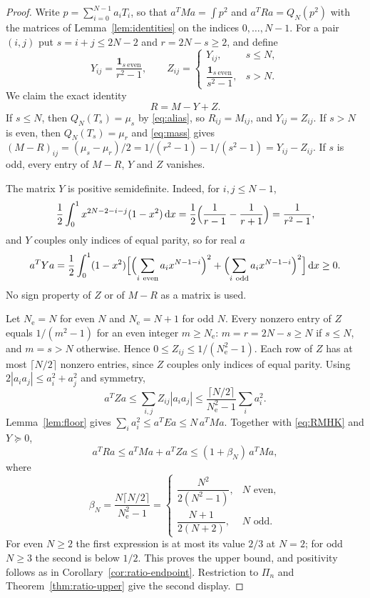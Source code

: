 \documentclass{siamart251216}
\newcommand{\Pn}{\Pi}
\newcommand{\dd}{\,\mathrm d}
\begin{document}
\begin{proof}
Write $p=\sum_{i=0}^{N-1}a_iT_i$, so that $a^TMa=\int p^2$ and
$a^TRa=Q_N(p^2)$ with the matrices of Lemma~\ref{lem:identities} on
the indices $0,\dots,N-1$. For a pair $(i,j)$ put $s=i+j\le2N-2$ and
$r=2N-s\ge2$, and define
\[
 Y_{ij}=\frac{\boldsymbol1_{s\ \mathrm{even}}}{r^2-1},\qquad
 Z_{ij}=\begin{cases}
   Y_{ij},&s\le N,\\[2pt]
   \dfrac{\boldsymbol1_{s\ \mathrm{even}}}{s^2-1},&s>N.
 \end{cases}
\]
We claim the exact identity
\begin{equation}\label{eq:RMHK}
 R=M-Y+Z .
\end{equation}
If $s\le N$, then $Q_N(T_s)=\mu_s$ by \eqref{eq:alias}, so $R_{ij}=M_{ij}$,
and $Y_{ij}=Z_{ij}$. If $s>N$ is even, then $Q_N(T_s)=\mu_r$ and
\eqref{eq:mass} gives
$(M-R)_{ij}=(\mu_s-\mu_r)/2=1/(r^2-1)-1/(s^2-1)=Y_{ij}-Z_{ij}$.
If $s$ is odd, every entry of $M-R$, $Y$ and $Z$ vanishes.

The matrix $Y$ is positive semidefinite. Indeed, for $i,j\le N-1$,
\[
 \frac12\int_0^1 x^{2N-2-i-j}(1-x^2)\dd x
 =\frac12\Bigl(\frac1{r-1}-\frac1{r+1}\Bigr)=\frac1{r^2-1},
\]
and $Y$ couples only indices of equal parity, so for real $a$
\[
 a^TYa=\frac12\int_0^1(1-x^2)\Bigl[
 \Bigl(\sum_{i\ \mathrm{even}}a_ix^{N-1-i}\Bigr)^2
 +\Bigl(\sum_{i\ \mathrm{odd}}a_ix^{N-1-i}\Bigr)^2\Bigr]\dd x\ge0 .
\]
No sign property of $Z$ or of $M-R$ as a matrix is used.

Let $N_{\mathrm e}=N$ for even $N$ and $N_{\mathrm e}=N+1$ for odd $N$. Every
nonzero entry of $Z$ equals $1/(m^2-1)$ for an even integer $m\ge N_{\mathrm e}$:
$m=r=2N-s\ge N$ if $s\le N$, and $m=s>N$ otherwise. Hence
$0\le Z_{ij}\le1/(N_{\mathrm e}^2-1)$. Each row of $Z$ has at most
$\lceil N/2\rceil$ nonzero entries, since $Z$ couples only indices of
equal parity. Using $2|a_ia_j|\le a_i^2+a_j^2$ and symmetry,
\[
 a^TZa\le\sum_{i,j}Z_{ij}|a_ia_j|
 \le\frac{\lceil N/2\rceil}{N_{\mathrm e}^2-1}\sum_ia_i^2 .
\]
Lemma~\ref{lem:floor} gives $\sum_ia_i^2\le a^TEa\le N\,a^TMa$.
Together with \eqref{eq:RMHK} and $Y\succeq0$,
\[
 a^TRa\le a^TMa+a^TZa\le(1+\beta_N)\,a^TMa,
\]
where
\[
 \beta_N=\frac{N\lceil N/2\rceil}{N_{\mathrm e}^2-1}
 =\begin{cases}
   \dfrac{N^2}{2(N^2-1)},&N\text{ even},\\[6pt]
   \dfrac{N+1}{2(N+2)},&N\text{ odd}.
 \end{cases}
\]
For even $N\ge2$ the first expression is at most its value $2/3$ at $N=2$;
for odd $N\ge3$ the second is below $1/2$. This proves the upper
bound, and positivity follows as in Corollary~\ref{cor:ratio-endpoint}.
Restriction to $\Pn_n$ and Theorem~\ref{thm:ratio-upper} give the
second display.
\end{proof}
\end{document}
